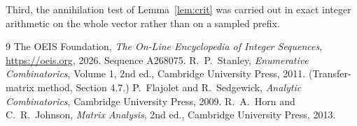 \documentclass[11pt,a4paper]{article}
\theoremstyle{plain}
\theoremstyle{definition}
\begin{document}
Third, the annihilation test of Lemma~\ref{lem:crit} was carried out in exact integer
arithmetic on the whole vector rather than on a sampled prefix.

\begin{thebibliography}{9}
 The OEIS Foundation, \emph{The On-Line Encyclopedia of Integer
Sequences}, \url{https://oeis.org}, 2026. Sequence A268075.
 R.~P.~Stanley, \emph{Enumerative Combinatorics}, Volume 1, 2nd ed.,
Cambridge University Press, 2011. (Transfer-matrix method, Section 4.7.)
 P.~Flajolet and R.~Sedgewick, \emph{Analytic Combinatorics}, Cambridge
University Press, 2009.
 R.~A.~Horn and C.~R.~Johnson, \emph{Matrix Analysis}, 2nd ed., Cambridge
University Press, 2013.
\end{thebibliography}
\end{document}
